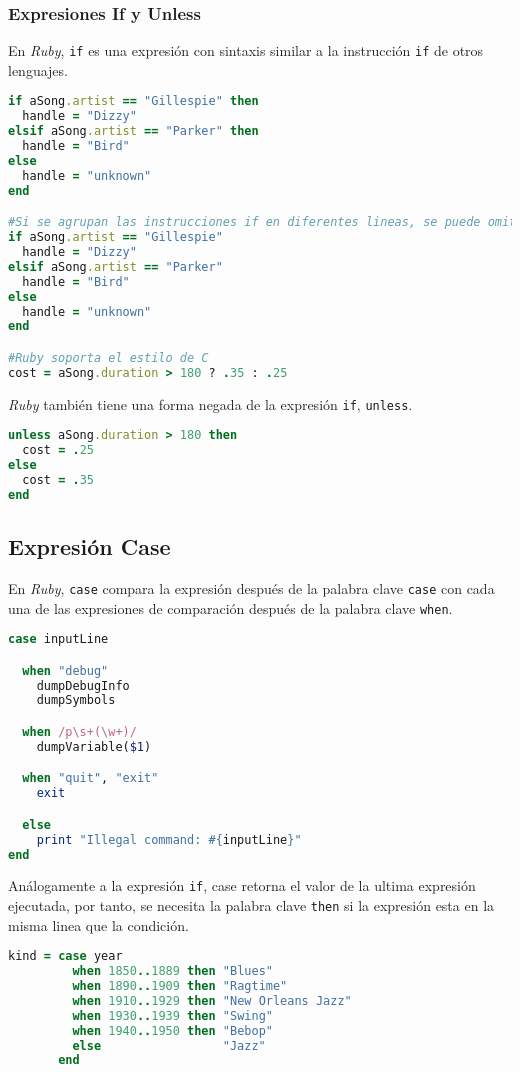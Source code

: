 \subsubsection{Expresiones If y Unless}
En \textit{Ruby}, \texttt{if} es una expresión con sintaxis similar a la instrucción \texttt{if} de otros lenguajes.

\begin{lstlisting}[language=Ruby]
if aSong.artist == "Gillespie" then
  handle = "Dizzy"
elsif aSong.artist == "Parker" then
  handle = "Bird"
else
  handle = "unknown"
end

#Si se agrupan las instrucciones if en diferentes lineas, se puede omitir el then
if aSong.artist == "Gillespie"
  handle = "Dizzy"
elsif aSong.artist == "Parker"
  handle = "Bird"
else
  handle = "unknown"
end

#Ruby soporta el estilo de C
cost = aSong.duration > 180 ? .35 : .25
\end{lstlisting}
\textit{Ruby} también tiene una forma negada de la expresión \texttt{if}, \texttt{unless}.

\begin{lstlisting}[language=Ruby]
unless aSong.duration > 180 then
  cost = .25
else
  cost = .35
end
\end{lstlisting}

\subsection{Expresión Case}
En \textit{Ruby}, \texttt{case} compara la expresión después de la palabra clave \texttt{case} con cada una de las expresiones de comparación después de la palabra clave \texttt{when}. 
\begin{lstlisting}[language=Ruby]
case inputLine

  when "debug"
    dumpDebugInfo
    dumpSymbols

  when /p\s+(\w+)/
    dumpVariable($1)

  when "quit", "exit"
    exit

  else
    print "Illegal command: #{inputLine}"
end
\end{lstlisting}

Análogamente a la expresión \texttt{if}, case retorna el valor de la ultima expresión ejecutada, por tanto, se necesita la palabra clave \texttt{then} si la expresión esta en la misma linea que la condición.

\begin{lstlisting}[language=Ruby]
kind = case year
         when 1850..1889 then "Blues"
         when 1890..1909 then "Ragtime"
         when 1910..1929 then "New Orleans Jazz"
         when 1930..1939 then "Swing"
         when 1940..1950 then "Bebop"
         else                 "Jazz"
       end
\end{lstlisting}

